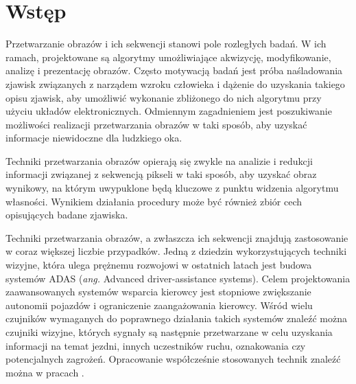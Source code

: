\chapter{Wstęp}
\label{cha:intruduction}


Przetwarzanie obrazów i ich sekwencji stanowi pole rozległych badań. %
W ich ramach, projektowane są algorytmy umożliwiające akwizycję, modyfikowanie, analizę i prezentację obrazów. %
Często motywacją badań jest próba naśladowania zjawisk związanych z narządem wzroku człowieka i dążenie do uzyskania takiego opisu zjawisk, aby umożliwić wykonanie zbliżonego do nich algorytmu przy użyciu układów elektronicznych. %
Odmiennym zagadnieniem jest poszukiwanie możliwości realizacji przetwarzania obrazów w taki sposób, aby uzyskać informacje niewidoczne dla ludzkiego oka. %

Techniki przetwarzania obrazów opierają się zwykle na analizie i redukcji informacji związanej z sekwencją pikseli w taki sposób, aby uzyskać obraz wynikowy, na którym uwypuklone będą kluczowe z punktu widzenia algorytmu własności. %
Wynikiem działania procedury może być również zbiór cech opisujących badane zjawiska.

Techniki przetwarzania obrazów, a zwłaszcza ich sekwencji znajdują zastosowanie w coraz większej liczbie przypadków. %
Jedną z dziedzin wykorzystujących techniki wizyjne, która ulega prężnemu rozwojowi w ostatnich latach jest budowa systemów ADAS (\emph{ang.} Advanced driver-assistance systems). %
Celem projektowania zaawansowanych systemów wsparcia kierowcy jest stopniowe zwiększanie autonomii pojazdów i ograniczenie zaangażowania kierowcy. 
Wśród wielu czujników wymaganych do poprawnego działania takich systemów znaleźć można czujniki wizyjne, których sygnały są następnie przetwarzane w celu uzyskania informacji na temat jezdni, innych uczestników ruchu, oznakowania czy potencjalnych zagrożeń. 
Opracowanie współcześnie stosowanych technik znaleźć można w pracach \cite{Bengler2014,Velez2017}.

